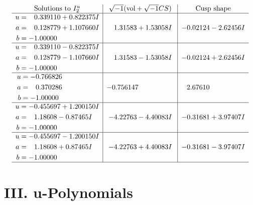 \documentclass[1p]{elsarticle_modified}
\theoremstyle{definition}
\newcommand{\I}{\sqrt{-1}}
\begin{document}
$$\begin{array}{c|c|c}  
\text{Solutions to }I^u_{2}& \I (\text{vol} + \sqrt{-1}CS) & \text{Cusp shape}\\
 \hline 
\begin{aligned}
u &= \phantom{-}0.339110 + 0.822375 I \\
a &= \phantom{-}0.128779 + 1.107660 I \\
b &= -1.00000\phantom{ +0.000000I}\end{aligned}
 & \phantom{-}1.31583 + 1.53058 I & -0.02124 - 2.62456 I \\ \hline\begin{aligned}
u &= \phantom{-}0.339110 - 0.822375 I \\
a &= \phantom{-}0.128779 - 1.107660 I \\
b &= -1.00000\phantom{ +0.000000I}\end{aligned}
 & \phantom{-}1.31583 - 1.53058 I & -0.02124 + 2.62456 I \\ \hline\begin{aligned}
u &= -0.766826\phantom{ +0.000000I} \\
a &= \phantom{-}0.370286\phantom{ +0.000000I} \\
b &= -1.00000\phantom{ +0.000000I}\end{aligned}
 & -0.756147\phantom{ +0.000000I} & \phantom{-}2.67610\phantom{ +0.000000I} \\ \hline\begin{aligned}
u &= -0.455697 + 1.200150 I \\
a &= \phantom{-}1.18608 - 0.87465 I \\
b &= -1.00000\phantom{ +0.000000I}\end{aligned}
 & -4.22763 - 4.40083 I & -0.31681 + 3.97407 I \\ \hline\begin{aligned}
u &= -0.455697 - 1.200150 I \\
a &= \phantom{-}1.18608 + 0.87465 I \\
b &= -1.00000\phantom{ +0.000000I}\end{aligned}
 & -4.22763 + 4.40083 I & -0.31681 - 3.97407 I\\
 \hline 
 \end{array}$$\newpage
\newpage\renewcommand{\arraystretch}{1}
\centering \section*{ III. u-Polynomials}
\end{document}
